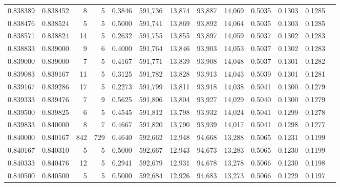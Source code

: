 \begin{tabular}{rrrrrrrrrrrrr}
0.838389 & 0.838452 &     8 &   5 &                                     0.3846 & 591,736 &  13,874 &  93,887 &  14,069 & 0.5035 & 0.1303 & 0.1285 \\
0.838476 & 0.838524 &     5 &   5 &                                     0.5000 & 591,741 &  13,869 &  93,892 &  14,064 & 0.5035 & 0.1303 & 0.1285 \\
0.838571 & 0.838824 &    14 &   5 &                                     0.2632 & 591,755 &  13,855 &  93,897 &  14,059 & 0.5037 & 0.1302 & 0.1283 \\
0.838833 & 0.839000 &     9 &   6 &                                     0.4000 & 591,764 &  13,846 &  93,903 &  14,053 & 0.5037 & 0.1302 & 0.1283 \\
0.839000 & 0.839000 &     7 &   5 &                                     0.4167 & 591,771 &  13,839 &  93,908 &  14,048 & 0.5037 & 0.1301 & 0.1282 \\
0.839083 & 0.839167 &    11 &   5 &                                     0.3125 & 591,782 &  13,828 &  93,913 &  14,043 & 0.5039 & 0.1301 & 0.1281 \\
0.839167 & 0.839286 &    17 &   5 &                                     0.2273 & 591,799 &  13,811 &  93,918 &  14,038 & 0.5041 & 0.1300 & 0.1279 \\
0.839333 & 0.839476 &     7 &   9 &                                     0.5625 & 591,806 &  13,804 &  93,927 &  14,029 & 0.5040 & 0.1300 & 0.1279 \\
0.839500 & 0.839825 &     6 &   5 &                                     0.4545 & 591,812 &  13,798 &  93,932 &  14,024 & 0.5041 & 0.1299 & 0.1278 \\
0.839833 & 0.840000 &     8 &   7 &                                     0.4667 & 591,820 &  13,790 &  93,939 &  14,017 & 0.5041 & 0.1298 & 0.1277 \\
0.840000 & 0.840167 &   842 & 729 &                                     0.4640 & 592,662 &  12,948 &  94,668 &  13,288 & 0.5065 & 0.1231 & 0.1199 \\
0.840167 & 0.840310 &     5 &   5 &                                     0.5000 & 592,667 &  12,943 &  94,673 &  13,283 & 0.5065 & 0.1230 & 0.1199 \\
0.840333 & 0.840476 &    12 &   5 &                                     0.2941 & 592,679 &  12,931 &  94,678 &  13,278 & 0.5066 & 0.1230 & 0.1198 \\
0.840500 & 0.840500 &     5 &   5 &                                     0.5000 & 592,684 &  12,926 &  94,683 &  13,273 & 0.5066 & 0.1229 & 0.1197 \\

\end{tabular}
